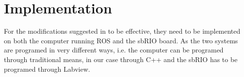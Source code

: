 \section{Implementation}
For the modifications suggested in  to be effective, they need to be implemented on both the computer running ROS and the sbRIO board. As the two systems are programed in very different ways, i.e. the computer can be programed through traditional means, in our case through C++ and the sbRIO has to be programed through Labview.
